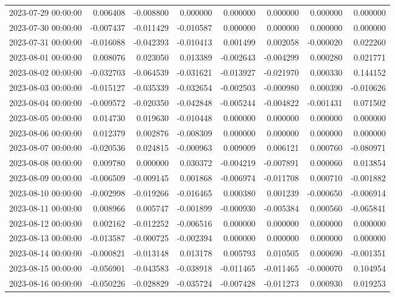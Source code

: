 \begin{tabular}{lrrrrrrr}
2023-07-29 00:00:00 & 0.006408 & -0.008800 & 0.000000 & 0.000000 & 0.000000 & 0.000000 & 0.000000 \\
2023-07-30 00:00:00 & -0.007437 & -0.011429 & -0.010587 & 0.000000 & 0.000000 & 0.000000 & 0.000000 \\
2023-07-31 00:00:00 & -0.016088 & -0.042393 & -0.010413 & 0.001499 & 0.002058 & -0.000020 & 0.022260 \\
2023-08-01 00:00:00 & 0.008076 & 0.023050 & 0.013389 & -0.002643 & -0.004299 & 0.000280 & 0.021771 \\
2023-08-02 00:00:00 & -0.032703 & -0.064539 & -0.031621 & -0.013927 & -0.021970 & 0.000330 & 0.144152 \\
2023-08-03 00:00:00 & -0.015127 & -0.035339 & -0.032654 & -0.002503 & -0.000980 & 0.000390 & -0.010626 \\
2023-08-04 00:00:00 & -0.009572 & -0.020350 & -0.042848 & -0.005244 & -0.004822 & -0.001431 & 0.071502 \\
2023-08-05 00:00:00 & 0.014730 & 0.019630 & -0.010448 & 0.000000 & 0.000000 & 0.000000 & 0.000000 \\
2023-08-06 00:00:00 & 0.012379 & 0.002876 & -0.008309 & 0.000000 & 0.000000 & 0.000000 & 0.000000 \\
2023-08-07 00:00:00 & -0.020536 & 0.024815 & -0.000963 & 0.009009 & 0.006121 & 0.000760 & -0.080971 \\
2023-08-08 00:00:00 & 0.009780 & 0.000000 & 0.030372 & -0.004219 & -0.007891 & 0.000060 & 0.013854 \\
2023-08-09 00:00:00 & -0.006509 & -0.009145 & 0.001868 & -0.006974 & -0.011708 & 0.000710 & -0.001882 \\
2023-08-10 00:00:00 & -0.002998 & -0.019266 & -0.016465 & 0.000380 & 0.001239 & -0.000650 & -0.006914 \\
2023-08-11 00:00:00 & 0.008966 & 0.005747 & -0.001899 & -0.000930 & -0.005384 & 0.000560 & -0.065841 \\
2023-08-12 00:00:00 & 0.002162 & -0.012252 & -0.006516 & 0.000000 & 0.000000 & 0.000000 & 0.000000 \\
2023-08-13 00:00:00 & -0.013587 & -0.000725 & -0.002394 & 0.000000 & 0.000000 & 0.000000 & 0.000000 \\
2023-08-14 00:00:00 & -0.000821 & -0.013148 & 0.013178 & 0.005793 & 0.010505 & 0.000690 & -0.001351 \\
2023-08-15 00:00:00 & -0.056901 & -0.043583 & -0.038918 & -0.011465 & -0.011465 & -0.000070 & 0.104954 \\
2023-08-16 00:00:00 & -0.050226 & -0.028829 & -0.035724 & -0.007428 & -0.011273 & 0.000930 & 0.019253 \\

\end{tabular}
